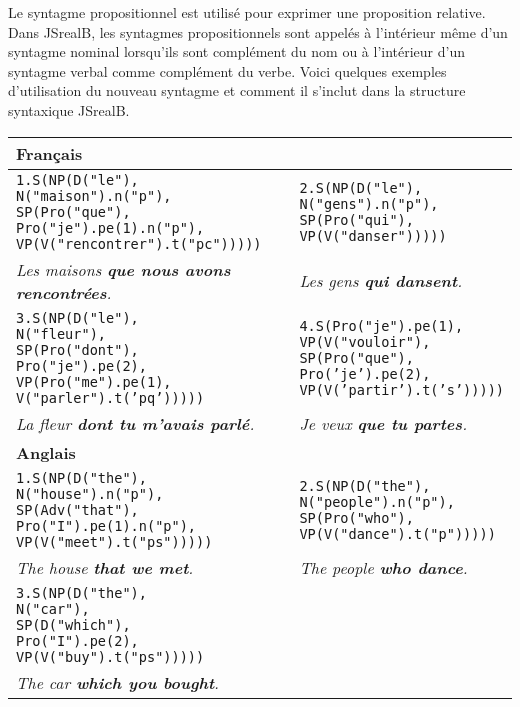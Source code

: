 \documentclass[11pt]{article} %
\newcommand{\code}[1]{\texttt{#1}}
\newcommand{\real}[1]{\emph{#1}}
\newcommand{\simpleExample}[2]{\begin{center}
                 \code{#1} \newline \real{#2}
                 \end{center}}
\begin{document}
Le syntagme propositionnel est utilisé pour exprimer une proposition
relative. Dans JSrealB, les syntagmes propositionnels sont appelés
à l'intérieur même d'un syntagme nominal lorsqu'ils sont complément
du nom ou à l'intérieur d'un syntagme verbal comme complément du verbe.
Voici quelques exemples d'utilisation du nouveau syntagme et comment
il s'inclut dans la structure syntaxique JSrealB.


\begin{tabular}{p{8cm} | p{7cm}}
\hline 
\textbf{Français} \\
\hline
\begin{alltt}
1.S(NP(D("le"),
       N("maison").n("p"),
       SP(Pro("que"),
          Pro("je").pe(1).n("p"),
          VP(V("rencontrer").t("pc")))))
\end{alltt} &
\begin{alltt}
2.S(NP(D("le"),
       N("gens").n("p"),
       SP(Pro("qui"),
          VP(V("danser")))))
\end{alltt} \\
\real{Les maisons \textbf{que nous avons rencontrées}.} & \real{Les gens \textbf{qui dansent}.} \\
\hline
\begin{alltt}
3.S(NP(D("le"),
       N("fleur"),
       SP(Pro("dont"),
          Pro("je").pe(2),
          VP(Pro("me").pe(1),
             V("parler").t('pq')))))
\end{alltt} &
\begin{alltt}
4.S(Pro("je").pe(1),
    VP(V("vouloir"),
       SP(Pro("que"),
          Pro('je').pe(2),
          VP(V('partir').t('s')))))
\end{alltt} \\
\real{La fleur \textbf{dont tu m'avais parlé}.} & \real{Je veux \textbf{que tu partes}.} \\
\hline 
\textbf{Anglais} \\
\hline
\begin{alltt}
1.S(NP(D("the"),
       N("house").n("p"),
       SP(Adv("that"),
          Pro("I").pe(1).n("p"),
          VP(V("meet").t("ps")))))
\end{alltt} &
\begin{alltt}
2.S(NP(D("the"),
       N("people").n("p"),
       SP(Pro("who"),
          VP(V("dance").t("p")))))
\end{alltt} \\
\real{The house \textbf{that we met}.} & \real{The people \textbf{who dance}.} \\
\hline
\begin{alltt}
3.S(NP(D("the"),
       N("car"),
       SP(D("which"),
          Pro("I").pe(2),
          VP(V("buy").t("ps")))))
\end{alltt} \\
\real{The car \textbf{which you bought}.}
\end{tabular}
\end{document}
